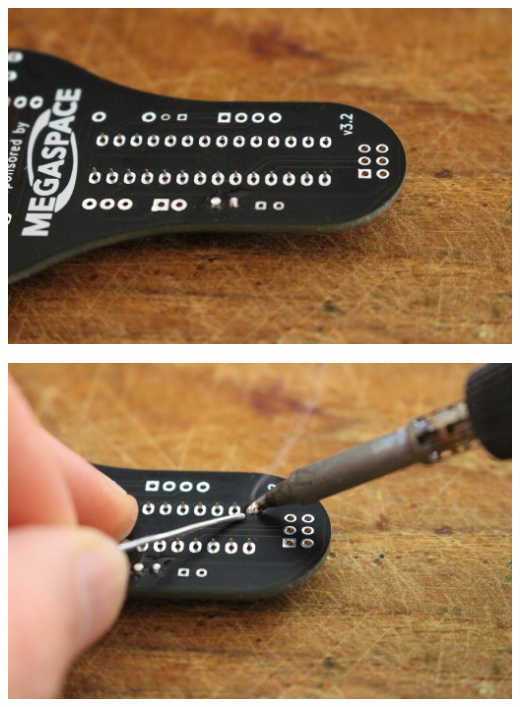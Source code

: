 \documentclass{article}
\begin{document}
\vspace{0.5cm}

\begin{minipage}[b]{0.5\textwidth}
	\includegraphics[width=\textwidth]{Bilder2022/IMG_8198.JPG}
\end{minipage}
\begin{minipage}[b]{0.5\textwidth}
	\includegraphics[width=\textwidth]{Bilder2022/IMG_8199.JPG}
\end{minipage}

\vspace{0.5cm}
\end{document}
